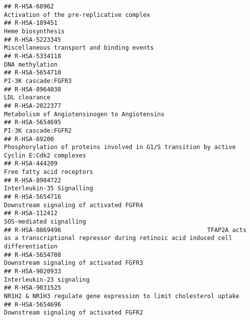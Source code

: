 \documentclass[
]{article}
\begin{document}
\begin{verbatim}
## R-HSA-68962                                                                                              Activation of the pre-replicative complex
## R-HSA-189451                                                                                                                     Heme biosynthesis
## R-HSA-5223345                                                                                           Miscellaneous transport and binding events
## R-HSA-5334118                                                                                                                      DNA methylation
## R-HSA-5654710                                                                                                                  PI-3K cascade:FGFR3
## R-HSA-8964038                                                                                                                        LDL clearance
## R-HSA-2022377                                                                                        Metabolism of Angiotensinogen to Angiotensins
## R-HSA-5654695                                                                                                                  PI-3K cascade:FGFR2
## R-HSA-69200                                              Phosphorylation of proteins involved in G1/S transition by active Cyclin E:Cdk2 complexes
## R-HSA-444209                                                                                                             Free fatty acid receptors
## R-HSA-8984722                                                                                                            Interleukin-35 Signalling
## R-HSA-5654716                                                                                              Downstream signaling of activated FGFR4
## R-HSA-112412                                                                                                               SOS-mediated signalling
## R-HSA-8869496                                         TFAP2A acts as a transcriptional repressor during retinoic acid induced cell differentiation
## R-HSA-5654708                                                                                              Downstream signaling of activated FGFR3
## R-HSA-9020933                                                                                                             Interleukin-23 signaling
## R-HSA-9031525                                                                  NR1H2 & NR1H3 regulate gene expression to limit cholesterol uptake 
## R-HSA-5654696                                                                                              Downstream signaling of activated FGFR2

\end{verbatim}
\end{document}
